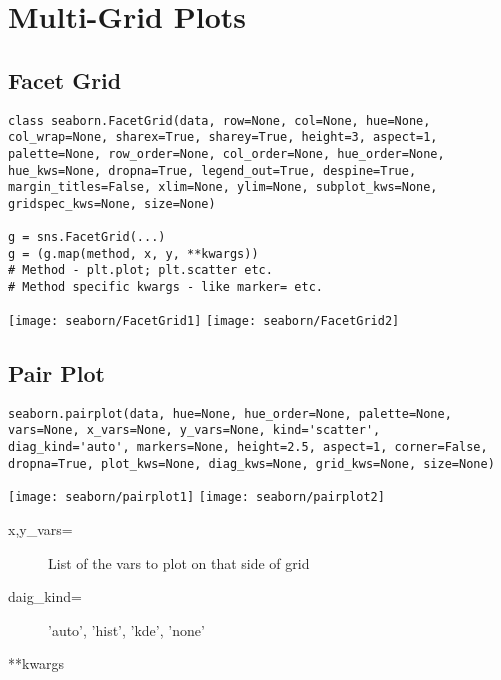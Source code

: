 \section{Multi-Grid Plots}

\subsection{Facet Grid}
\begin{verbatim}
class seaborn.FacetGrid(data, row=None, col=None, hue=None, 
col_wrap=None, sharex=True, sharey=True, height=3, aspect=1, 
palette=None, row_order=None, col_order=None, hue_order=None, 
hue_kws=None, dropna=True, legend_out=True, despine=True, 
margin_titles=False, xlim=None, ylim=None, subplot_kws=None, 
gridspec_kws=None, size=None)

g = sns.FacetGrid(...)
g = (g.map(method, x, y, **kwargs))
# Method - plt.plot; plt.scatter etc.
# Method specific kwargs - like marker= etc.
\end{verbatim}
\texttt{[image: seaborn/FacetGrid1]}
\texttt{[image: seaborn/FacetGrid2]}

\subsection{Pair Plot}
\begin{verbatim}
seaborn.pairplot(data, hue=None, hue_order=None, palette=None, 
vars=None, x_vars=None, y_vars=None, kind='scatter', 
diag_kind='auto', markers=None, height=2.5, aspect=1, corner=False, 
dropna=True, plot_kws=None, diag_kws=None, grid_kws=None, size=None)
\end{verbatim}
\texttt{[image: seaborn/pairplot1]}
\texttt{[image: seaborn/pairplot2]}
\begin{description}
	\item[{x,y}\_vars=] List of the vars to plot on that side of grid
	\item[daig\_kind=] 'auto', 'hist', 'kde', 'none'
	\item[**kwargs] 
\end{description}

